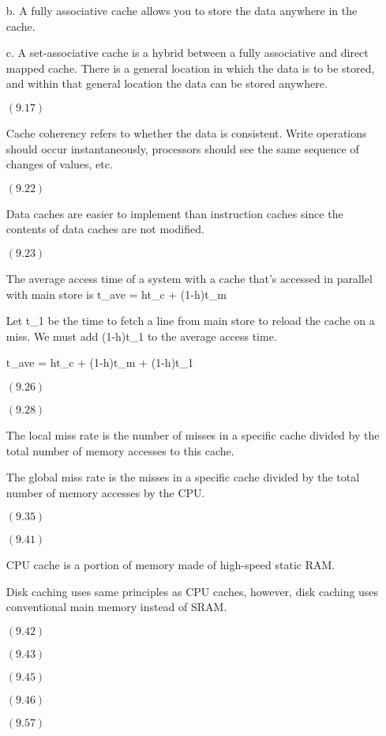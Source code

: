\documentclass[letterpaper,10pt,titlepage]{article}
\begin{document}
\begin{enumerate}
  b.  A fully associative cache allows you to store the data anywhere in the cache.

  c.  A set-associative cache is a hybrid between a fully associative and direct mapped cache.  There is a general location in which the data is to be stored, and within that general location the data can be stored anywhere.
  
\item[$(9.17)$]

  Cache coherency refers to whether the data is consistent.  Write operations should occur instantaneously, processors should see the same sequence of changes of values, etc.
  
\item[$(9.22)$]

  Data caches are easier to implement than instruction caches since the contents of data caches are not modified.

\item[$(9.23)$]

  The average access time of a system with a cache that's accessed in parallel with main store is t_{ave} = ht_{c} + (1-h)t_{m}
  
  Let t_{1} be the time to fetch a line from main store to reload the cache on a miss.  We must add (1-h)t_{1} to the average access time.
  
  t_{ave} = ht_{c} + (1-h)t_{m} + (1-h)t_{1}

\item[$(9.26)$]

\item[$(9.28)$]

  The local miss rate is the number of misses in a specific cache divided by the total number of memory accesses to this cache.
  
  The global miss rate is the misses in a specific cache divided by the total number of memory accesses by the CPU.

\item[$(9.35)$]

\item[$(9.41)$]

  CPU cache is a portion of memory made of high-speed static RAM.
  
  Disk caching uses same principles as CPU caches, however, disk caching uses conventional main memory instead of SRAM.

\item[$(9.42)$]

\item[$(9.43)$]

  

\item[$(9.45)$]

\item[$(9.46)$]

\item[$(9.57)$]
  
\begin{lstlisting}
\end{lstlisting}
  
\end{enumerate}
\end{document}
